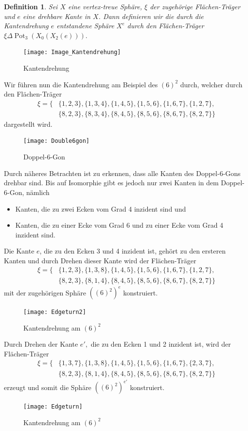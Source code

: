 \documentclass[12pt,titlepage,twoside,cleardoublepage]{article}
\theoremstyle{nummermitklammern}
\newtheorem{definition}[temp]{Definition}
\newtheorem{definition}[zahl]{Definition}
\numberwithin{equation}{section}
\DeclareMathOperator{\Pot}{Pot}
\begin{document}
\begin{definition}
Sei $X$ eine vertex-treue Sphäre, $\xi$ der zugehörige Flächen-Träger und $e$ eine drehbare Kante in $X$. Dann definieren wir die durch die Kantendrehung $e$ entstandene Sphäre $X^e$ durch den Flächen-Träger $\xi \Delta \Pot_3(X_0(X_2(e))).$
\end{definition}
\begin{figure}[H]
\begin{center}
\texttt{[image: Image\_Kantendrehung]}
\end{center}
\caption{Kantendrehung}
\end{figure}
 Wir führen nun die Kantendrehung am Beispiel des $(6)^2$  durch, welcher durch den Flächen-Träger
\begin{align*}
\xi=\{&\{1,2,3\},\{1,3,4\},\{1,4,5\},\{1,5,6\},\{1,6,7\},\{1,2,7\},\\ 
&\{8,2,3\},\{8,3,4\},\{8,4,5\},\{8,5,6\},\{8,6,7\},\{8,2,7\}\}
\end{align*}
dargestellt wird. 
\begin{figure}[H]
\begin{center}
\texttt{[image: Double6gon]}
\end{center}
\caption{Doppel-6-Gon}
\end{figure}
Durch näheres Betrachten ist zu erkennen, dass alle Kanten des Doppel-6-Gons drehbar sind. Bis auf Isomorphie gibt es jedoch nur zwei Kanten in dem Doppel-6-Gon, nämlich 
\begin{itemize}
\item Kanten, die zu zwei Ecken vom Grad 4 inzident sind und
\item Kanten, die zu einer Ecke vom Grad 6 und zu einer Ecke vom Grad 4 inzident sind.
\end{itemize} 
Die Kante $e$, die zu den Ecken 3 und 4 inzident ist, gehört zu den ersteren Kanten und durch Drehen dieser Kante wird der Flächen-Träger 
\begin{align*}
\xi=\{&\{1,2,3\},\{1,3,8\},\{1,4,5\},\{1,5,6\},\{1,6,7\},\{1,2,7\},\\ 
&\{8,2,3\},\{8,1,4\},\{8,4,5\},\{8,5,6\},\{8,6,7\},\{8,2,7\}\}
\end{align*}
mit der zugehörigen Sphäre ${((6)^2)}^e$ konstruiert.
\begin{figure}[H]
\begin{center}
\texttt{[image: Edgeturn2]}
\end{center}
\caption{Kantendrehung am $(6)^2$ }
\end{figure}
 Durch Drehen der Kante $e',$ die zu den Ecken 1 und 2 inzident ist, wird der Flächen-Träger 
\begin{align*}
\xi=\{&\{1,3,7\},\{1,3,8\},\{1,4,5\},\{1,5,6\},\{1,6,7\},\{2,3,7\},\\ 
&\{8,2,3\},\{8,1,4\},\{8,4,5\},\{8,5,6\},\{8,6,7\},\{8,2,7\}\}
\end{align*}
erzeugt und somit die Sphäre ${((6)^2)}^{e'}$ konstruiert.
\begin{figure}[H]
\begin{center}
\texttt{[image: Edgeturn]}
\end{center}
\caption{Kantendrehung am $(6)^2$ }
\end{figure}
\end{document}
